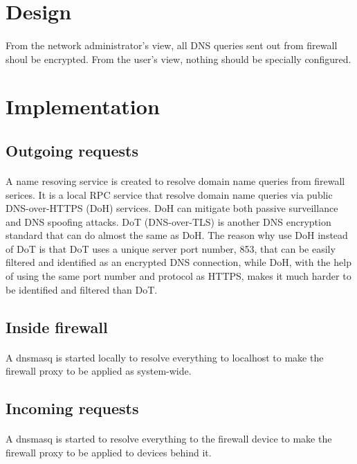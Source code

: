 \documentclass[mscthesis]{usiinfthesis}
\begin{document}
\section{Design}
\paragraph{}
From the network administrator's view, all DNS queries sent out from firewall shoul be encrypted. From the user's view, nothing should be specially configured.

\section{Implementation}
\subsection{Outgoing requests}
\paragraph{}
A name resoving service is created to resolve domain name queries from firewall serices. It is a local RPC service that resolve domain name queries via public DNS-over-HTTPS (DoH) services. DoH can mitigate both passive surveillance and DNS spoofing attacks\citep{rfc:doh8}. DoT (DNS-over-TLS) is another DNS encryption standard that can do almost the same as DoH. The reason why use DoH instead of DoT is that DoT uses a unique server port number, 853, that can be easily filtered and identified as an encrypted DNS connection, while DoH, with the help of using the same port number and protocol as HTTPS, makes it much harder to be identified and filtered than DoT.
\subsection{Inside firewall}
\paragraph{}
A dnsmasq is started locally to resolve everything to localhost to make the firewall proxy to be applied as system-wide.
\subsection{Incoming requests}
\paragraph{}
A dnsmasq is started to resolve everything to the firewall device to make the firewall proxy to be applied to devices behind it.
\end{document}

